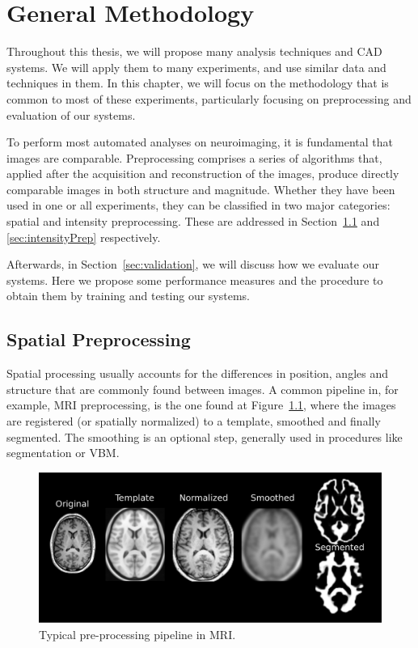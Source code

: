 \chapter{General Methodology}\label{ch:preprocessing} %
Throughout this thesis, we will propose many analysis techniques and \ac{CAD} systems. We will apply them to many experiments, and use similar data and techniques in them. In this chapter, we will focus on the methodology that is common to most of these experiments, particularly focusing on preprocessing and evaluation of our systems. 

To perform most automated analyses on neuroimaging, it is fundamental that images are comparable. Preprocessing comprises a series of algorithms that, applied after the acquisition and reconstruction of the images, produce directly comparable images in both structure and magnitude. Whether they have been used in one or all experiments, they can be classified in two major categories: spatial and intensity preprocessing. These are addressed in Section~\ref{sec:spatial} and \ref{sec:intensityPrep} respectively. 

Afterwards, in Section~\ref{sec:validation}, we will discuss how we evaluate our systems. Here we propose some performance measures and the procedure to obtain them by training and testing our systems.  


\section{Spatial Preprocessing}\label{sec:spatial}
Spatial processing usually accounts for the differences in position, angles and structure that are commonly found between images. A common pipeline in, for example, \ac{MRI} preprocessing, is the one found at Figure~\ref{fig:examplePreMRI}, where the images are registered (or spatially normalized) to a template, smoothed and finally segmented. The smoothing is an optional step, generally used in procedures like segmentation or \ac{VBM}. 

\begin{figure}[htp]
	\myfloatalign
	\includegraphics[width=.7\linewidth]{Graphics/ch3/preProcessPL}
	\caption[Typical pre-processing pipeline in \acs{MRI}]{Typical pre-processing pipeline in \ac{MRI}.}\label{fig:examplePreMRI}
\end{figure}

